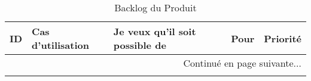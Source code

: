 \begin{center}
    \footnotesize
    \setlength\LTleft{-20pt}
    \begin{longtable}{| l | p{3.5cm} | p{5.5cm} | p{5cm} | l |}
        \caption{Backlog du Produit}
        \label{tab:product-backlog} \\

        \hline
        \textbf{ID} & \textbf{Cas d'utilisation} & \textbf{Je veux qu'il soit possible de} & \textbf{Pour} & \textbf{Priorité} \\ \hline
        \endhead

        \hline \multicolumn{5}{|r|}{{Continué en page suivante$\dotsc$}} \\ \hline
        \endfoot

        \hline \hline
        \endlastfoot

        \hline


\end{longtable}
\end{center}
